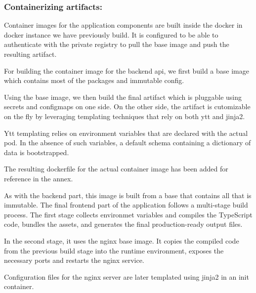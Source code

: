 \subsubsection{Containerizing artifacts:}

\hspace{7mm}Container images for the application components are built inside the docker in docker instance we have previously build. It is configured to be able to authenticate with the private registry to pull the base image and push the resulting artifact. 


\hspace{7mm}For building the container image for the backend api, we first build a base image which contains most of the packages and immutable config. 

\hspace{7mm}Using the base image, we then build the final artifact which is pluggable using secrets and configmaps on one side. On the other side, the artifact is cutomizable on the fly by leveraging templating techniques that rely on both ytt and jinja2.

\hspace{7mm}Ytt templating relies on environment variables that are declared with the actual pod. In the absence of such variables, a default schema containing a dictionary of data is bootstrapped.

\hspace{7mm}The resulting dockerfile for the actual container image has been added for reference in the annex. 


\hspace{7mm}As with the backend part, this image is built from a base that contains all that is immutable. The final frontend part of the application follows a multi-stage build process. The first stage collects environmet variables and compiles the TypeScript code, bundles the assets, and generates the final production-ready output files.

\hspace{7mm}In the second stage, it uses the nginx base image. It copies the compiled code from the previous build stage into the runtime environment, exposes the necessary ports and restarts the nginx service.

\hspace{7mm}Configuration files for the nginx server are later templated using jinja2 in an init container.

